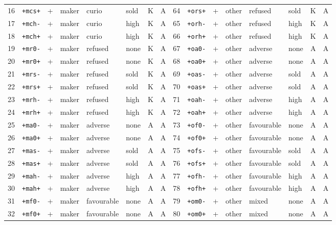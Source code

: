 {\begin{longtable}{@{}rlllllcc@{\hspace{2.2em}}rlllllcc@{}}
16 & \texttt{+mcs+} & + & maker & curio & sold & K & A & 64 & \texttt{+ors+} & + & other & refused & sold & K & A \\
17 & \texttt{+mch-} & + & maker & curio & high & K & A & 65 & \texttt{+orh-} & + & other & refused & high & K & A \\
18 & \texttt{+mch+} & + & maker & curio & high & K & A & 66 & \texttt{+orh+} & + & other & refused & high & K & A \\
19 & \texttt{+mr0-} & + & maker & refused & none & K & A & 67 & \texttt{+oa0-} & + & other & adverse & none & A & A \\
20 & \texttt{+mr0+} & + & maker & refused & none & K & A & 68 & \texttt{+oa0+} & + & other & adverse & none & A & A \\
21 & \texttt{+mrs-} & + & maker & refused & sold & K & A & 69 & \texttt{+oas-} & + & other & adverse & sold & A & A \\
22 & \texttt{+mrs+} & + & maker & refused & sold & K & A & 70 & \texttt{+oas+} & + & other & adverse & sold & A & A \\
23 & \texttt{+mrh-} & + & maker & refused & high & K & A & 71 & \texttt{+oah-} & + & other & adverse & high & A & A \\
24 & \texttt{+mrh+} & + & maker & refused & high & K & A & 72 & \texttt{+oah+} & + & other & adverse & high & A & A \\
25 & \texttt{+ma0-} & + & maker & adverse & none & A & A & 73 & \texttt{+of0-} & + & other & favourable & none & A & A \\
26 & \texttt{+ma0+} & + & maker & adverse & none & A & A & 74 & \texttt{+of0+} & + & other & favourable & none & A & A \\
27 & \texttt{+mas-} & + & maker & adverse & sold & A & A & 75 & \texttt{+ofs-} & + & other & favourable & sold & A & A \\
28 & \texttt{+mas+} & + & maker & adverse & sold & A & A & 76 & \texttt{+ofs+} & + & other & favourable & sold & A & A \\
29 & \texttt{+mah-} & + & maker & adverse & high & A & A & 77 & \texttt{+ofh-} & + & other & favourable & high & A & A \\
30 & \texttt{+mah+} & + & maker & adverse & high & A & A & 78 & \texttt{+ofh+} & + & other & favourable & high & A & A \\
31 & \texttt{+mf0-} & + & maker & favourable & none & A & A & 79 & \texttt{+om0-} & + & other & mixed & none & A & A \\
32 & \texttt{+mf0+} & + & maker & favourable & none & A & A & 80 & \texttt{+om0+} & + & other & mixed & none & A & A \\

\end{longtable}}
